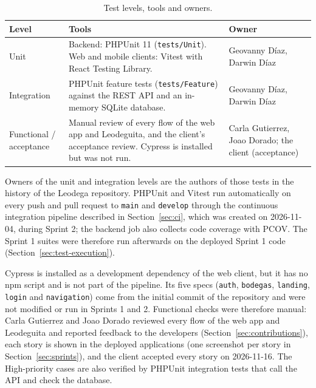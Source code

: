 \begin{table}[H]
  \centering
  \begin{tabularx}{\linewidth}{L{3.2cm}L{6.3cm}Y}
    \toprule
    Level & Tools & Owner \\
    \midrule
    Unit & Backend: PHPUnit 11 (\texttt{tests/Unit}). Web and mobile clients: Vitest with
           React Testing Library. & Geovanny Díaz, Darwin Díaz \\
    Integration & PHPUnit feature tests (\texttt{tests/Feature}) against the REST API and an
                  in-memory SQLite database. & Geovanny Díaz, Darwin Díaz \\
    Functional / acceptance & Manual review of every flow of the web app and Leodeguita, and the
                              client's acceptance review. Cypress is installed but was not
                              run. & Carla Gutierrez, Joao Dorado; the client (acceptance) \\
    \bottomrule
  \end{tabularx}
  \caption{Test levels, tools and owners.}
  \label{tab:test-levels}
\end{table}

Owners of the unit and integration levels are the authors of those tests in the history of the
Leodega repository. PHPUnit and Vitest run automatically on every push and pull request to
\texttt{main} and \texttt{develop} through the continuous integration pipeline described in
Section~\ref{sec:ci}, which was created on 2026-11-04, during Sprint 2; the backend job also
collects code coverage with PCOV\@. The Sprint 1 suites were therefore run afterwards on the
deployed Sprint 1 code (Section~\ref{sec:test-execution}).

Cypress is installed as a development dependency of the web client, but it has no npm script and
is not part of the pipeline. Its five specs (\texttt{auth}, \texttt{bodegas}, \texttt{landing},
\texttt{login} and \texttt{navigation}) come from the initial commit of the repository and were
not modified or run in Sprints 1 and 2. Functional checks were therefore manual: Carla Gutierrez
and Joao Dorado reviewed every flow of the web app and Leodeguita and reported feedback to the
developers (Section~\ref{sec:contributions}), each story is shown in the deployed applications
(one screenshot per story in Section~\ref{sec:sprints}), and the client accepted every story on
2026-11-16. The High-priority cases are also verified by PHPUnit integration tests that call the
API and check the database.

